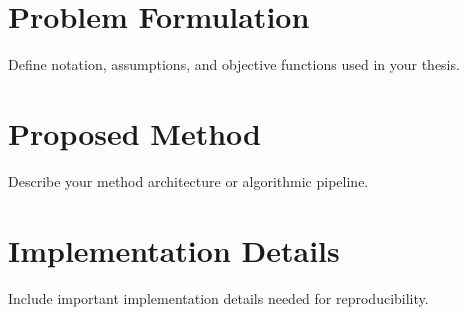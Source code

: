 \section{Problem Formulation}

Define notation, assumptions, and objective functions used in your thesis.

\section{Proposed Method}

Describe your method architecture or algorithmic pipeline.

\section{Implementation Details}

Include important implementation details needed for reproducibility.

